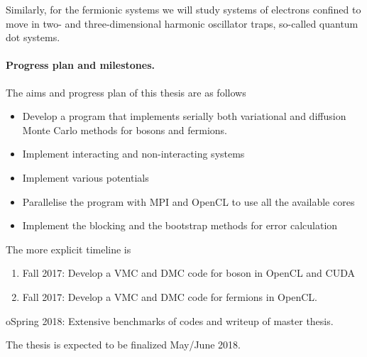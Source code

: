 \documentclass[%
oneside,                 %
final,                   %
10pt]{article}
\begin{document}
Similarly, for the fermionic systems we will study systems of electrons confined to move in two- and three-dimensional harmonic oscillator traps, so-called quantum dot systems.


\paragraph{Progress plan and milestones.}
The aims and progress plan of this thesis are as follows

\begin{itemize}
\item Develop a program that implements serially both variational and diffusion Monte Carlo methods for bosons and fermions.

\item Implement interacting and non-interacting systems

\item Implement various potentials

\item Parallelise the program with MPI and OpenCL to use all the available cores

\item Implement the blocking and the bootstrap methods  for error calculation
\end{itemize}

\noindent
The more explicit timeline is 

\begin{enumerate}
 \item Fall 2017: Develop a VMC and DMC code for boson in OpenCL and CUDA

 \item Fall 2017: Develop a VMC and DMC  code for fermions in OpenCL.
\end{enumerate}

\noindent
 oSpring 2018: Extensive benchmarks of codes and writeup of master thesis.


The thesis is expected to be finalized May/June 2018.
















\end{document}

